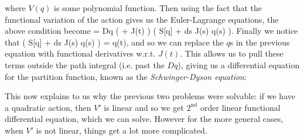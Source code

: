 \ese 
where $V(q)$ is some polynomial function. Then using the fact that the functional variation of the action gives us the Euler-Lagrange equations, the above condition become 
 = \cN\int Dq \bigg(   + J(t) \bigg) \exp\bigg( S[q] + \int ds J(s) q(s) \bigg).
\ese 
Finally we notice that 
\bse 
    \exp\bigg( S[q] + \int ds J(s) q(s) \bigg) = q(t),
\ese 
and so we can replace the $q$s in the previous equation with functional derivatives w.r.t. $J(t)$. This allows us to pull these terms outside the path integral (i.e. past the $Dq$), giving us a differential equation for the partition function, known as the \textit{Schwinger-Dyson equation}: 

This now explains to us why the previous two problems were solvable: if we have a quadratic action, then $V'$ is linear and so we get $2^{\text{nd}}$ order linear functional differential equation, which we can solve. However for the more general cases, when $V'$ is not linear, things get a lot more complicated. 